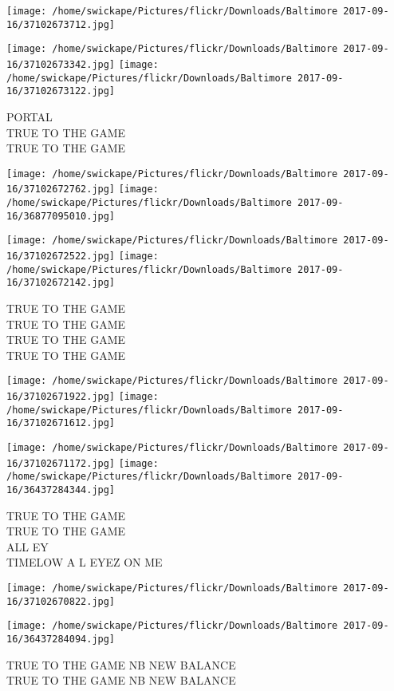 \documentclass[10pt,letterpaper]{article}
\begin{document}
\texttt{[image: /home/swickape/Pictures/flickr/Downloads/Baltimore 2017-09-16/37102673712.jpg]}

\vspace{0.25in}
\texttt{[image: /home/swickape/Pictures/flickr/Downloads/Baltimore 2017-09-16/37102673342.jpg]}
\texttt{[image: /home/swickape/Pictures/flickr/Downloads/Baltimore 2017-09-16/37102673122.jpg]}

PORTAL\\
TRUE TO THE GAME\\
TRUE TO THE GAME
\pagebreak

\texttt{[image: /home/swickape/Pictures/flickr/Downloads/Baltimore 2017-09-16/37102672762.jpg]}
\texttt{[image: /home/swickape/Pictures/flickr/Downloads/Baltimore 2017-09-16/36877095010.jpg]}

\texttt{[image: /home/swickape/Pictures/flickr/Downloads/Baltimore 2017-09-16/37102672522.jpg]}
\texttt{[image: /home/swickape/Pictures/flickr/Downloads/Baltimore 2017-09-16/37102672142.jpg]}

TRUE TO THE GAME\\
TRUE TO THE GAME\\
TRUE TO THE GAME\\
TRUE TO THE GAME
\pagebreak

\texttt{[image: /home/swickape/Pictures/flickr/Downloads/Baltimore 2017-09-16/37102671922.jpg]}
\texttt{[image: /home/swickape/Pictures/flickr/Downloads/Baltimore 2017-09-16/37102671612.jpg]}

\texttt{[image: /home/swickape/Pictures/flickr/Downloads/Baltimore 2017-09-16/37102671172.jpg]}
\texttt{[image: /home/swickape/Pictures/flickr/Downloads/Baltimore 2017-09-16/36437284344.jpg]}

TRUE TO THE GAME\\
TRUE TO THE GAME\\
ALL EY\\
TIMELOW A L EYEZ ON ME
\pagebreak

\texttt{[image: /home/swickape/Pictures/flickr/Downloads/Baltimore 2017-09-16/37102670822.jpg]}

\vspace{0.25in}
\texttt{[image: /home/swickape/Pictures/flickr/Downloads/Baltimore 2017-09-16/36437284094.jpg]}

TRUE TO THE GAME NB NEW BALANCE\\
TRUE TO THE GAME NB NEW BALANCE
\pagebreak
\end{document}
